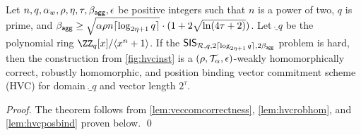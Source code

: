 \begin{theorem}\label{theo:veccom}
  Let $n,q,\alpha_w,\rho,\eta,\tau,\beta_{\mathsf{agg}},\epsilon$ be positive integers such that $n$ is a power of two, $q$ is prime, and $\beta_{\mathsf{agg}} \geq \sqrt{\alpha\rho  n\lceil\log_{2\eta+1} q\rceil}\cdot(1+2\sqrt{\ln(4\tau+2)})$.
  Let $\ring_q$ be the polynomial ring $\ZZ_q[x]/\langle x^n+1\rangle$.
  If the $\mathsf{SIS}_{\mathcal{R},q,2\lceil \log_{2\eta+1} q \rceil,2\beta_{\mathsf{agg}}}$ problem is hard, then the construction from \autoref{fig:hvcinst} is a $(\rho,\mathcal{T}_\alpha,\epsilon)$-weakly homomorphically correct, robustly homomorphic, and position binding vector commitment scheme (HVC) for domain $\ring_q$ and vector length $2^\tau$.
\end{theorem}
\begin{proof}
  The theorem follows from \autoref{lem:veccomcorrectness}, \autoref{lem:hvcrobhom}, and \autoref{lem:hvcposbind} proven below. \qed
\end{proof}

